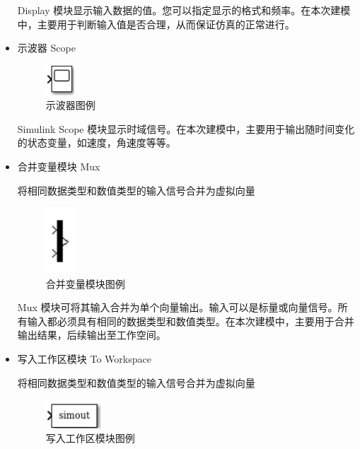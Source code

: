 \begin{itemize}
	Display 模块显示输入数据的值。您可以指定显示的格式和频率。在本次建模中，主要用于判断输入值是否合理，从而保证仿真的正常进行。
	
	\item 示波器 Scope
	
	\begin{figure}[H]
		\centering
		\includegraphics[width=0.1\textwidth]{fig/simulink/scope_block.png}
		\caption{示波器图例}\label{fig:scope_block}
	\end{figure}
	
	Simulink Scope 模块显示时域信号。在本次建模中，主要用于输出随时间变化的状态变量，如速度，角速度等等。
	
	\item 合并变量模块 Mux
	
	将相同数据类型和数值类型的输入信号合并为虚拟向量
	
	\begin{figure}[H]
		\centering
		\includegraphics[width=0.1\textwidth]{fig/simulink/mux_block.png}
		\caption{合并变量模块图例}\label{fig:mux_block}
	\end{figure}
	
	Mux 模块可将其输入合并为单个向量输出。输入可以是标量或向量信号。所有输入都必须具有相同的数据类型和数值类型。在本次建模中，主要用于合并输出结果，后续输出至工作空间。
	
	\item 写入工作区模块 To Workspace
		
	将相同数据类型和数值类型的输入信号合并为虚拟向量
	
	\begin{figure}[H]
		\centering
		\includegraphics[width=0.2\textwidth]{fig/simulink/to_workspace_block.png}
		\caption{写入工作区模块图例}\label{fig:to_workspace_block}
	\end{figure}
	

\end{itemize}
